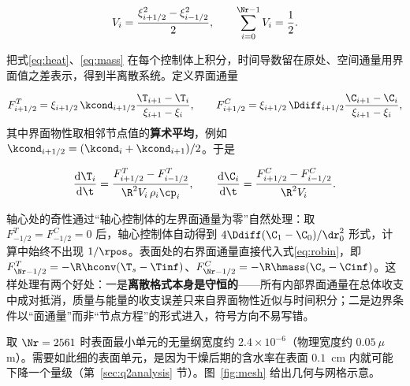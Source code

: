 \begin{equation}
V_i=\frac{\xi_{i+1/2}^2-\xi_{i-1/2}^2}{2},
\qquad \sum_{i=0}^{\Nr-1}V_i=\frac12 .
\label{eq:cellvolume}
\end{equation}

把式\eqref{eq:heat}、\eqref{eq:mass} 在每个控制体上积分，时间导数留在原处、空间通量用界面值之差表示，得到半离散系统。定义界面通量

\begin{equation}
F^T_{i+1/2}=\xi_{i+1/2}\,{\kcond}_{i+1/2}\frac{{\T}_{i+1}-{\T}_i}{\xi_{i+1}-\xi_i},
\qquad
F^C_{i+1/2}=\xi_{i+1/2}\,{\Ddiff}_{i+1/2}\frac{{\C}_{i+1}-{\C}_i}{\xi_{i+1}-\xi_i},
\label{eq:flux}
\end{equation}
其中界面物性取相邻节点值的\textbf{算术平均}，例如 ${\kcond}_{i+1/2}=({\kcond}_i+{\kcond}_{i+1})/2$。于是

\begin{equation}
\frac{\mathrm{d}{\T}_i}{\mathrm{d}\t}
=\frac{F^T_{i+1/2}-F^T_{i-1/2}}{{\R}^2V_i\,\rho_i{\cp}_i},
\qquad
\frac{\mathrm{d}{\C}_i}{\mathrm{d}\t}
=\frac{F^C_{i+1/2}-F^C_{i-1/2}}{{\R}^2V_i}.
\label{eq:semi}
\end{equation}

轴心处的奇性通过``轴心控制体的左界面通量为零''自然处理：取 $F^T_{-1/2}=F^C_{-1/2}=0$ 后，轴心控制体自动得到 $4\Ddiff({\C}_1-{\C}_0)/\dr_0^2$ 形式，计算中始终不出现 $1/\rpos$。表面处的右界面通量直接代入式\eqref{eq:robin}，即 $F^T_{\Nr-1/2}=-\R\hconv({\T}_s-\Tinf)$、$F^C_{\Nr-1/2}=-\R\hmass({\C}_s-\Cinf)$。这样处理有两个好处：一是\textbf{离散格式本身是守恒的}——所有内部界面通量在总体收支中成对抵消，质量与能量的收支误差只来自界面物性近似与时间积分；二是边界条件以``面通量''而非``节点方程''的形式进入，符号方向不易写错。

取 $\Nr=2561$ 时表面最小单元的无量纲宽度约 $2.4\times10^{-6}$（物理宽度约 $0.05~\mu$m）。需要如此细的表面单元，是因为干燥后期的含水率在表面 $0.1$~cm 内就可能下降一个量级（第~\ref{sec:q2analysis} 节）。图~\ref{fig:mesh} 给出几何与网格示意。


